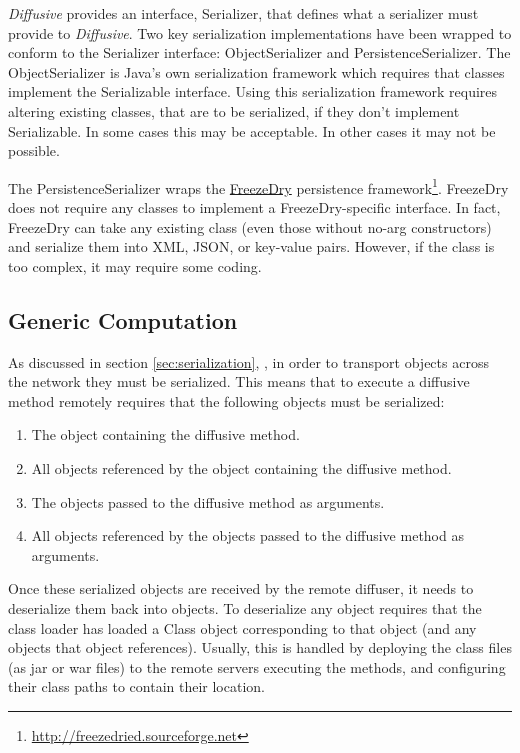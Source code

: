 \documentclass[11pt]{article}
\begin{document}
\emph{Diffusive} provides an interface, \textsf{Serializer}, that defines what a serializer must provide to \emph{Diffusive}. Two key serialization implementations have been wrapped to conform to the \textsf{Serializer} interface: \textsf{ObjectSerializer} and \textsf{PersistenceSerializer}. The \textsf{ObjectSerializer} is Java's own serialization framework which requires that classes implement the \textsf{Serializable} interface. Using this serialization framework requires altering existing classes, that are to be serialized, if they don't implement \textsf{Serializable}. In some cases this may be acceptable. In other cases it may not be possible.

The \textsf{PersistenceSerializer} wraps the \href{http://freezedried.sourceforge.net}{FreezeDry} persistence framework\footnote{\url{http://freezedried.sourceforge.net}}. FreezeDry does not require any classes to implement a FreezeDry-specific interface. In fact, FreezeDry can take any existing class (even those without no-arg constructors) and serialize them into XML, JSON, or key-value pairs. However, if the class is too complex, it may require some coding.

\subsection{Generic Computation\label{sec:generic_computation}}
As discussed in section \ref{sec:serialization}, , in order to transport objects across the network they must be serialized. This means that to execute a diffusive method remotely requires that the following objects must be serialized:
\begin{enumerate}
\item The object containing the diffusive method.
\item All objects referenced by the object containing the diffusive method.
\item The objects passed to the diffusive method as arguments.
\item All objects referenced by the objects passed to the diffusive method as arguments.
\end{enumerate}
Once these serialized objects are received by the remote diffuser, it needs to deserialize them back into objects. To deserialize any object requires that the class loader has loaded a \textsf{Class} object corresponding to that object (and any objects that object references). Usually, this is handled by deploying the class files (as jar or war files) to the remote servers executing the methods, and configuring their class paths to contain their location.
\end{document}
